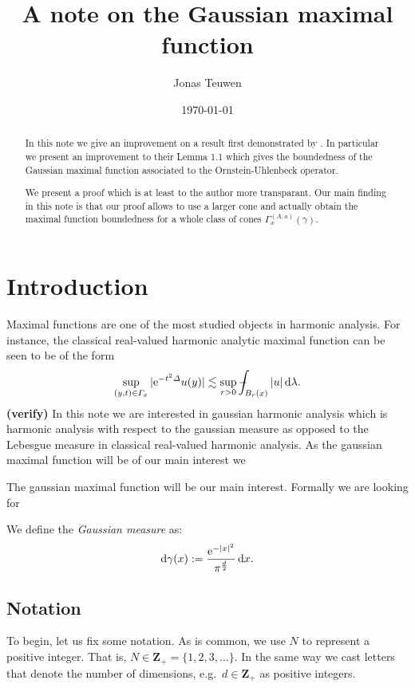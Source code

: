 \documentclass[a4paper,oneside,10pt]{amsproc}
\title[Gaussian maximal functions]{A note on the Gaussian maximal function}
\author{Jonas Teuwen}%
\date{\today}
\theoremstyle{plain}
\theoremstyle{remark}
\theoremstyle{definition}
\newcommand{\D}{\,\textup{d}}
\def\Xint#1{\mathchoice
  {\XXint\displaystyle\textstyle{#1}}%
  {\XXint\textstyle\scriptstyle{#1}}%
  {\XXint\scriptstyle\scriptscriptstyle{#1}}%
  {\XXint\scriptscriptstyle\scriptscriptstyle{#1}}%
  \!\int}
\def\XXint#1#2#3{{\setbox0=\hbox{$#1{#2#3}{\int}$ }
    \vcenter{\hbox{$#2#3$ }}\kern-.535\wd0}}
\def\dashint{\Xint-}
\newcommand{\Z}{\mathbf Z}
\newcommand{\e}{\mathrm{e}} %
\begin{document}
\begin{abstract}
  In this note we give an improvement on a result first demonstrated
  by \textcite{Pineda2008}. In particular we present an improvement to
  their Lemma 1.1 which gives the boundedness of the
  Gaussian maximal function associated to the Ornstein-Uhlenbeck
  operator.

  We present a proof which is at least to the author more transparant.
  Our main finding in this note is that our proof allows to use a
  larger cone and actually obtain the maximal function boundedness for
  a whole class of cones $\Gamma^{(A, a)}_x(\gamma)$.
\end{abstract}


\maketitle
\section{Introduction}
Maximal functions are one of the most studied objects in harmonic
analysis. 
For instance, the classical real-valued harmonic analytic maximal
function can be seen to be of the form
\begin{equation*}
  \sup_{(y, t) \in \Gamma_x} |\e^{-t^2 \Delta} u(y)| \lesssim \sup_{r
    > 0}  \dashint_{B_r(x)} |u| \D\lambda.
\end{equation*}
\textbf{(verify)}
In this note we are interested in gaussian harmonic analysis
which is harmonic analysis with respect to the gaussian measure as
opposed to the Lebesgue measure in classical real-valued harmonic
analysis. As the gaussian maximal function will be of our main
interest we 

The gaussian maximal function will be our main interest.
Formally we are looking for 

We define the \emph{Gaussian measure} as:
\begin{equation}
  \label{eq:Gaussian-measure}
  \mathrm{d}\gamma(x) := \frac{\e^{-|x|^2}}{\pi^{\frac{d}2}} \D{x}.
\end{equation}



\textcite{Pineda2008}

\subsection{Notation}
To begin, let us fix some notation. As is common, we use $N$ to
represent a positive integer. That is, $N \in \Z_+ = \{1, 2, 3,
\dots\}$. In the same way we cast letters that denote the number of
dimensions, e.g.\ $d \in \Z_+$ as positive integers.
\end{document}
